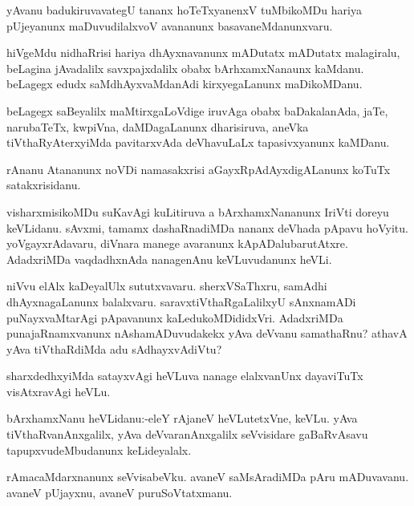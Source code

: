\documentclass{article}
\begin{document}
\begin{mn}%
yAvanu badukiruvavategU tananx hoTeTxyanenxV tuMbikoMDu hariya pUjeyanunx maDuvudilalxvoV 
avananunx basavaneMdanunxvaru.
\end{mn}

\begin{mn}%
hiVgeMdu nidhaRrisi hariya dhAyxnavanunx mADutatx mADutatx malagiralu, beLagina jAvadalilx 
savxpajxdalilx obabx bArhxamxNanaunx kaMdanu. beLagegx edudx saMdhAyxvaMdanAdi 
kirxyegaLanunx maDikoMDanu.
\end{mn}

\begin{mn}%
beLagegx saBeyalilx maMtirxgaLoVdige iruvAga obabx baDakalanAda, jaTe, narubaTeTx, 
kwpiVna, daMDagaLanunx dharisiruva, aneVka tiVthaRyAterxyiMda pavitarxvAda deVhavuLaLx 
tapasivxyanunx kaMDanu.
\end{mn}

\begin{mn}%
rAnanu Atananunx noVDi namasakxrisi aGayxRpAdAyxdigALanunx koTuTx satakxrisidanu.
\end{mn}

\begin{mn}%
visharxmisikoMDu suKavAgi kuLitiruva a bArxhamxNananunx IriVti doreyu keVLidanu. sAvxmi, 
tamamx dashaRnadiMDa nananx deVhada pApavu hoVyitu. yoVgayxrAdavaru, diVnara manege 
avaranunx kApADalubarutAtxre. AdadxriMDa vaqdadhxnAda nanagenAnu keVLuvudanunx heVLi.
\end{mn}

\begin{mn}%
niVvu elAlx kaDeyalUlx sututxvavaru. sherxVSaThxru, samAdhi dhAyxnagaLanunx balalxvaru. 
saravxtiVthaRgaLalilxyU sAnxnamADi puNayxvaMtarAgi pApavanunx kaLedukoMDididxVri. 
AdadxriMDa punajaRnamxvanunx nAshamADuvudakekx yAva deVvanu samathaRnu? athavA yAva 
tiVthaRdiMda adu sAdhayxvAdiVtu?
\end{mn}

\begin{mn}%
sharxdedhxyiMda satayxvAgi heVLuva nanage elalxvanUnx dayaviTuTx visAtxravAgi heVLu.
\end{mn}

\begin{mn}%
bArxhamxNanu heVLidanu:-eleY rAjaneV heVLutetxVne, keVLu. yAva tiVthaRvanAnxgalilx, yAva 
deVvaranAnxgalilx seVvisidare gaBaRvAsavu tapupxvudeMbudanunx keLideyalalx.
\end{mn}

\begin{mn}%
rAmacaMdarxnanunx seVvisabeVku. avaneV saMsAradiMDa pAru mADuvavanu. avaneV pUjayxnu, 
avaneV puruSoVtatxmanu.
\end{mn}
\end{document}
